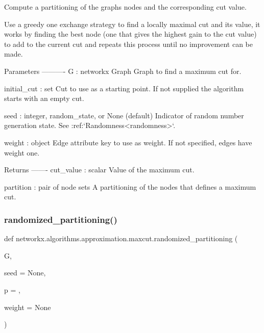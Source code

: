 \begin{DoxyVerb}Compute a partitioning of the graphs nodes and the corresponding cut value.

Use a greedy one exchange strategy to find a locally maximal cut
and its value, it works by finding the best node (one that gives
the highest gain to the cut value) to add to the current cut
and repeats this process until no improvement can be made.

Parameters
----------
G : networkx Graph
    Graph to find a maximum cut for.

initial_cut : set
    Cut to use as a starting point. If not supplied the algorithm
    starts with an empty cut.

seed : integer, random_state, or None (default)
    Indicator of random number generation state.
    See :ref:`Randomness<randomness>`.

weight : object
    Edge attribute key to use as weight. If not specified, edges
    have weight one.

Returns
-------
cut_value : scalar
    Value of the maximum cut.

partition : pair of node sets
    A partitioning of the nodes that defines a maximum cut.
\end{DoxyVerb}
 \mbox{\label{namespacenetworkx_1_1algorithms_1_1approximation_1_1maxcut_aba14cb3f2eb41bb77918b1e5a3473ecb}} 
\subsubsection{\texorpdfstring{randomized\+\_\+partitioning()}{randomized\_partitioning()}}
{\footnotesize\ttfamily def networkx.\+algorithms.\+approximation.\+maxcut.\+randomized\+\_\+partitioning (\begin{DoxyParamCaption}\item[{}]{G,  }\item[{}]{seed = {\ttfamily None},  }\item[{}]{p = {},  }\item[{}]{weight = {\ttfamily None} }\end{DoxyParamCaption})}

